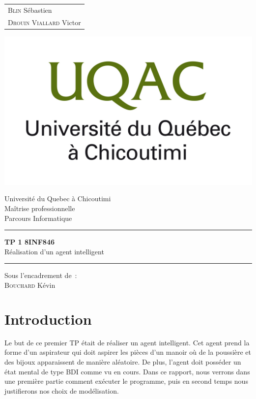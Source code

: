 \documentclass{article}
\begin{document}
\begin{titlepage}
	\vspace{-20px}
	\begin{tabular}{l}
		\textsc{Blin} Sébastien\\
		\textsc{Drouin Viallard} Victor
	\end{tabular}
	\hfill \vspace{10px}\includegraphics[scale=0.1]{uqac}\\
	\vfill
	\begin{center}
		\Huge{Université du Quebec à Chicoutimi}\\
		\vspace{1cm}
		\LARGE{Maîtrise professionnelle}\\
		\large{Parcours Informatique}\\
		\vspace{0.5cm}\hrule\vspace{0.5cm}
		\LARGE{\textbf{TP 1 8INF846}}\\
		\Large{Réalisation d'un agent intelligent}
		\vspace{0.5cm}\hrule
		\vfill
		\vfill
	\end{center}
	\begin{flushleft}
		\Large{Sous l'encadrement de~:}\\
		\vspace{0.2cm}
		\large{\textsc{Bouchard} Kévin}
	\end{flushleft}
	\vfill
\end{titlepage}

\section{Introduction}
Le but de ce premier TP était de réaliser un agent intelligent. Cet agent prend
la forme d'un aspirateur qui doit aspirer les pièces d'un manoir où de la
poussière et des bijoux apparaissent de manière aléatoire. De plus, l'agent doit
posséder un état mental de type BDI comme vu en cours. Dans ce rapport, nous
verrons dans une première partie comment exécuter le programme, puis en second
temps nous justifierons nos choix de modélisation.
\end{document}
